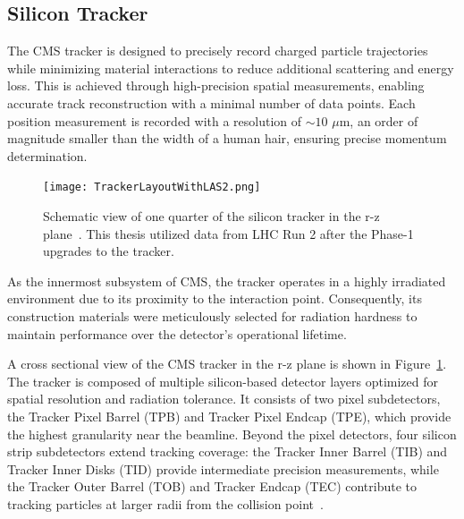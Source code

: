 \subsection{Silicon Tracker}

The CMS tracker is designed to precisely record charged particle trajectories while minimizing material interactions to reduce additional scattering and energy loss. This is achieved through high-precision spatial measurements, enabling accurate track reconstruction with a minimal number of data points. Each position measurement is recorded with a resolution of $\sim10$ $\mu$m, an order of magnitude smaller than the width of a human hair, ensuring precise momentum determination.

\begin{figure}[!hbt]
    \begin{center}
        \texttt{[image: TrackerLayoutWithLAS2.png]}
        \caption{Schematic view of one quarter of the silicon tracker in the r-z plane~\cite{Adam:2748381}. This thesis utilized data from LHC Run 2 after the Phase-1 upgrades to the tracker.}
        \label{fig:silicontracker}
    \end{center}
\end{figure}

As the innermost subsystem of CMS, the tracker operates in a highly irradiated environment due to its proximity to the interaction point. Consequently, its construction materials were meticulously selected for radiation hardness to maintain performance over the detector’s operational lifetime.

A cross sectional view of the CMS tracker in the r-z plane is shown in Figure~\ref{fig:silicontracker}. The tracker is composed of multiple silicon-based detector layers optimized for spatial resolution and radiation tolerance. It consists of two pixel subdetectors, the Tracker Pixel Barrel (TPB) and Tracker Pixel Endcap (TPE), which provide the highest granularity near the beamline. Beyond the pixel detectors, four silicon strip subdetectors extend tracking coverage: the Tracker Inner Barrel (TIB) and Tracker Inner Disks (TID) provide intermediate precision measurements, while the Tracker Outer Barrel (TOB) and Tracker Endcap (TEC) contribute to tracking particles at larger radii from the collision point~\cite{Chatrchyan:1667597}. 


